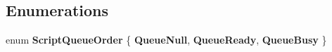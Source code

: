 \subsection*{Enumerations}
\begin{DoxyCompactItemize}
\item 
\hypertarget{namespacelib_watcher_dialog_1_1_combine_rules_acbe41dabff3b32fa0695d6a005f3657f}{enum {\bfseries Script\+Queue\+Order} \{ {\bfseries Queue\+Null}, 
{\bfseries Queue\+Ready}, 
{\bfseries Queue\+Busy}
 \}}\label{namespacelib_watcher_dialog_1_1_combine_rules_acbe41dabff3b32fa0695d6a005f3657f}

\end{DoxyCompactItemize}
